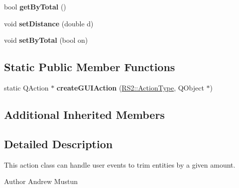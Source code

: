 \begin{DoxyCompactItemize}
\item 
\hypertarget{classRS__ActionModifyTrimAmount_ae33db5333b7431d07065027f1efeeb13}{bool {\bfseries get\-By\-Total} ()}\label{classRS__ActionModifyTrimAmount_ae33db5333b7431d07065027f1efeeb13}

\item 
\hypertarget{classRS__ActionModifyTrimAmount_a9635bcca5db0f7c5bc7d794a4713d7cd}{void {\bfseries set\-Distance} (double d)}\label{classRS__ActionModifyTrimAmount_a9635bcca5db0f7c5bc7d794a4713d7cd}

\item 
\hypertarget{classRS__ActionModifyTrimAmount_a85e57da929ee7beed2297ad552927f33}{void {\bfseries set\-By\-Total} (bool on)}\label{classRS__ActionModifyTrimAmount_a85e57da929ee7beed2297ad552927f33}

\end{DoxyCompactItemize}
\subsection*{Static Public Member Functions}
\begin{DoxyCompactItemize}
\item 
\hypertarget{classRS__ActionModifyTrimAmount_abfbfe33ad7abdaf37c0b903c158bf40f}{static Q\-Action $\ast$ {\bfseries create\-G\-U\-I\-Action} (\hyperlink{classRS2_afe3523e0bc41fd637b892321cfc4b9d7}{R\-S2\-::\-Action\-Type}, Q\-Object $\ast$)}\label{classRS__ActionModifyTrimAmount_abfbfe33ad7abdaf37c0b903c158bf40f}

\end{DoxyCompactItemize}
\subsection*{Additional Inherited Members}


\subsection{Detailed Description}
This action class can handle user events to trim entities by a given amount.

\begin{DoxyAuthor}{Author}
Andrew Mustun 
\end{DoxyAuthor}


